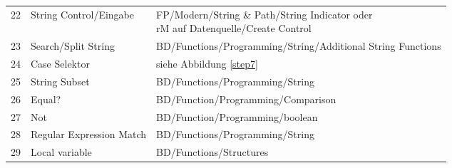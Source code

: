\begin{table}[hptb!]
\begin{center}
\begin{tabularx}{1\textwidth}{m{0.5cm}m{4.5cm}X}
22 & String Control/Eingabe & \makecell[l]{ FP/Modern/String \& Path/String Indicator oder\\ rM auf Datenquelle/Create Control}\\
23 & Search/Split String & BD/Functions/Programming/String/Additional String Functions\\
24 & Case Selektor & siehe Abbildung \ref{step7} \\
25 & String Subset & BD/Functions/Programming/String \\
26 & Equal? & BD/Function/Programming/Comparison \\
27 & Not & BD/Function/Programming/boolean \\
28 & Regular Expression Match & BD/Functions/Programming/String \\
29 & Local variable & BD/Functions/Structures \\




\hline
\end{tabularx}
\end{center}
\label{tab:labviewserialobject}
\end{table}

\pagebreak

